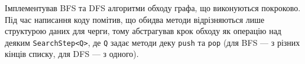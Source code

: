 \conclusion%
Імплементував BFS та DFS алгоритми обходу графа, що виконуються покроково.\linebreak
Під час написання коду помітив, що обидва методи відрізняються лише структурою даних для черги,
тому абстрагував крок обходу як операцію над деяким \texttt{SearchStep<Q>}, де \texttt{Q} задає
методи деку \texttt{push} та \texttt{pop}
(для BFS --- з різних кінців списку, для DFS --- з одного).



